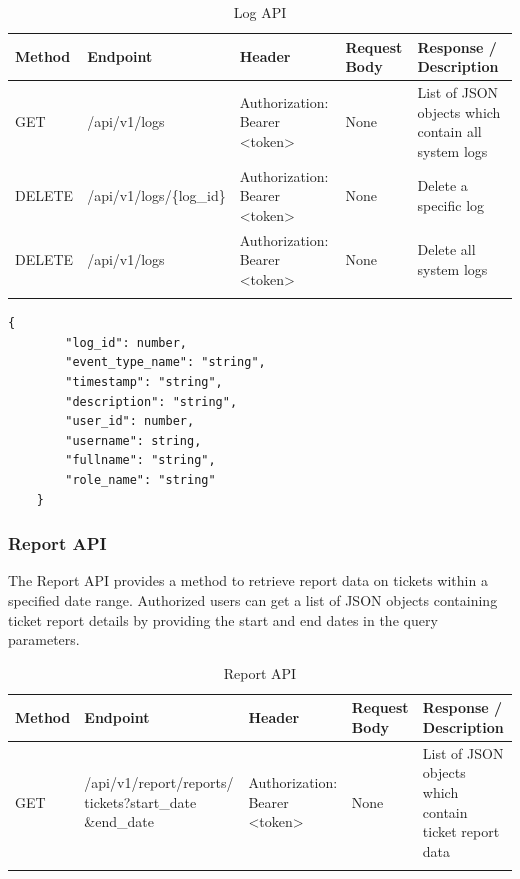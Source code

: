 \begin{longtable}{|m{1.6cm}|m{4.6cm}|m{3cm}|m{2.8cm}|m{3.4cm}|}
	\hline
	\textbf{Method} & \textbf{Endpoint} & \textbf{Header}                                                                                                                            & \textbf{Request Body} & \textbf{Response / Description}   \\ \hline
	\endhead
	
	GET & /api/v1/logs & Authorization: Bearer <token>  & None & List of JSON objects which contain all system logs \\ \hline
	
	
	DELETE & /api/v1/logs/\{log\_id\} & Authorization: Bearer <token>  & None & Delete a specific log\\ \hline
	
	DELETE & /api/v1/logs  & Authorization: Bearer <token>  & None & Delete all system logs\\ \hline
	
	
	\caption{Log API}
	\label{tab:log-api}
	
\end{longtable}


\begin{lstlisting}[breaklines=true, caption=Log Schema]
	{
		"log_id": number,
		"event_type_name": "string",
		"timestamp": "string",
		"description": "string",
		"user_id": number,
		"username": string,
		"fullname": "string",
		"role_name": "string"
	}
\end{lstlisting}



\subsubsection{Report API}
The Report API provides a method to retrieve report data on tickets within a specified date range. Authorized users can get a list of JSON objects containing ticket report details by providing the start and end dates in the query parameters.

\begin{longtable}{|m{1.6cm}|m{4.6cm}|m{3cm}|m{2.8cm}|m{3.4cm}|}
	\hline
	\textbf{Method} & \textbf{Endpoint} & \textbf{Header}                                                                                                                            & \textbf{Request Body} & \textbf{Response / Description}   \\ \hline
	\endhead
	
	GET & /api/v1/report/reports/ \newline tickets?start\_date \newline \&end\_date & Authorization: Bearer <token>  & None & List of JSON objects which contain ticket report data \\ \hline
	
	
	\caption{Report API}
	\label{tab:report-api}
	
\end{longtable}





